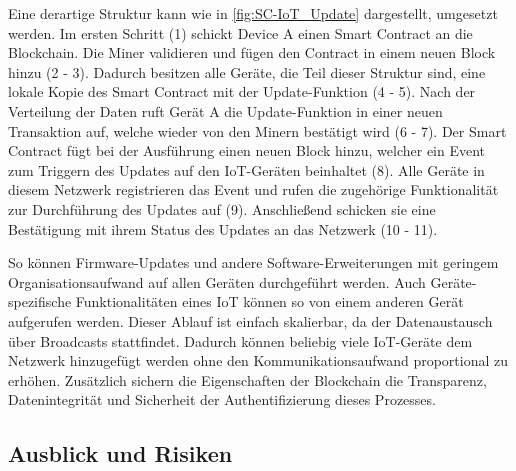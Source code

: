 Eine derartige Struktur kann wie in \autoref{fig:SC-IoT_Update} dargestellt, umgesetzt werden.
Im ersten Schritt (1) schickt Device A einen Smart Contract an die Blockchain. Die Miner validieren 
und fügen den Contract in einem neuen Block hinzu (2 - 3). Dadurch besitzen alle Geräte, die Teil dieser 
Struktur sind, eine lokale Kopie des Smart Contract mit der Update-Funktion (4 - 5).
Nach der Verteilung der Daten ruft Gerät A die Update-Funktion in einer neuen Transaktion auf, welche 
wieder von den Minern bestätigt wird (6 - 7). 
Der Smart Contract fügt bei der Ausführung einen neuen Block hinzu, welcher ein Event zum
Triggern des Updates auf den IoT-Geräten beinhaltet (8). 
Alle Geräte in diesem Netzwerk registrieren das Event und rufen die zugehörige Funktionalität zur Durchführung
des Updates auf (9). Anschließend schicken sie eine Bestätigung mit ihrem Status des Updates an das Netzwerk (10 - 11).

So können Firmware-Updates und andere Software-Erweiterungen mit geringem Organisationsaufwand auf allen 
Geräten durchgeführt werden. 
Auch Geräte-spezifische Funktionalitäten eines IoT können so von einem anderen Gerät aufgerufen werden.
Dieser Ablauf ist einfach skalierbar, da der Datenaustausch über Broadcasts stattfindet.  
Dadurch können beliebig viele IoT-Geräte dem Netzwerk hinzugefügt werden ohne den Kommunikationsaufwand 
proportional zu erhöhen. 
Zusätzlich sichern die Eigenschaften der Blockchain die Transparenz, Datenintegrität und Sicherheit der
Authentifizierung dieses Prozesses.
\cite[p.~74f]{Choi2018DeviceControl}



\cite[p.~171]{chowdhary2025smart}





\subsection{Ausblick und Risiken}

